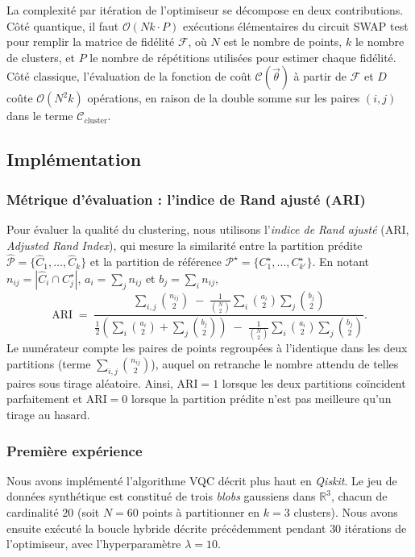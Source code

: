 \documentclass[a4paper]{article}
\begin{document}
La complexité par itération de l'optimiseur se décompose en deux contributions. Côté quantique, il faut $\mathcal{O}(N k \cdot P)$ exécutions élémentaires du circuit SWAP test pour remplir la matrice de fidélité $\mathcal{F}$, où $N$ est le nombre de points, $k$ le nombre de clusters, et $P$ le nombre de répétitions utilisées pour estimer chaque fidélité. Côté classique, l'évaluation de la fonction de coût $\mathcal{C}(\vec{\theta})$ à partir de $\mathcal{F}$ et $D$ coûte $\mathcal{O}(N^2 k)$ opérations, en raison de la double somme sur les paires $(i,j)$ dans le terme $\mathcal{C}_{\text{cluster}}$.

\subsection{Implémentation}

\subsubsection*{Métrique d'évaluation : l'indice de Rand ajusté (ARI)}

Pour évaluer la qualité du clustering, nous utilisons l'\emph{indice de Rand ajusté} (ARI, \emph{Adjusted Rand Index}), qui mesure la similarité entre la partition prédite $\hat{\mathcal{P}} = \{\hat{C}_1,\dots,\hat{C}_k\}$ et la partition de référence $\mathcal{P}^{\star} = \{C_1^{\star},\dots,C_{k'}^{\star}\}$. En notant $n_{ij} = |\hat{C}_i \cap C_j^{\star}|$, $a_i = \sum_j n_{ij}$ et $b_j = \sum_i n_{ij}$,
\[
\mathrm{ARI} \;=\; \frac{\displaystyle\sum_{i,j}\binom{n_{ij}}{2} \;-\; \tfrac{1}{\binom{N}{2}}\sum_i \binom{a_i}{2}\sum_j \binom{b_j}{2}}{\tfrac{1}{2}\!\left(\sum_i \binom{a_i}{2} + \sum_j \binom{b_j}{2}\right) \;-\; \tfrac{1}{\binom{N}{2}}\sum_i \binom{a_i}{2}\sum_j \binom{b_j}{2}}.
\]
Le numérateur compte les paires de points regroupées à l'identique dans les deux partitions (terme $\sum_{i,j}\binom{n_{ij}}{2}$), auquel on retranche le nombre attendu de telles paires sous tirage aléatoire. Ainsi, $\mathrm{ARI} = 1$ lorsque les deux partitions coïncident parfaitement et $\mathrm{ARI} = 0$ lorsque la partition prédite n'est pas meilleure qu'un tirage au hasard.

\subsubsection*{Première expérience}

Nous avons implémenté l'algorithme VQC décrit plus haut en \emph{Qiskit}. Le jeu de données synthétique est constitué de trois \emph{blobs} gaussiens dans $\mathbb{R}^3$, chacun de cardinalité $20$ (soit $N = 60$ points à partitionner en $k = 3$ clusters). Nous avons ensuite exécuté la boucle hybride décrite précédemment pendant $30$ itérations de l'optimiseur, avec l'hyperparamètre $\lambda = 10$.
\end{document}
